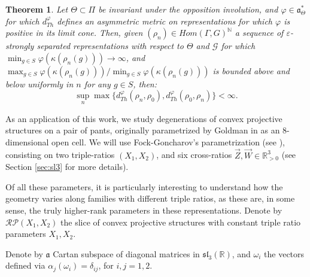 \documentclass{amsart}
\newtheorem{thm}{Theorem}[section]
\theoremstyle{remark}
\theoremstyle{definition}
\begin{document}
\begin{thm}
Let $\Theta \subset \Pi$ be invariant under the opposition involution, and $\varphi \in \mathfrak{a}_\Theta^*$ for which $d^{\varphi}_{Th}$ defines an asymmetric metric on representations for which $\varphi$ is positive in its limit cone. 
Then, given $(\rho_n) \in Hom (\Gamma,G)^\mathbb{N}$ a sequence of $\varepsilon$-strongly separated representations with respect to $\Theta$ and $\mathcal{G}$ for which $\min_{g \in S} \varphi (\kappa (\rho_n (g)))\to \infty$, and $\max_{g \in S} \varphi (\kappa (\rho_n (g)))/\min_{g \in S} \varphi (\kappa (\rho_n (g)))$ is bounded above and below uniformly in $n$ for any $g \in S$, then:
$$\sup_n \max\{ d_{Th}^\varphi (\rho_n, \rho_0), d_{Th}^\varphi (\rho_0,\rho_n)\} <\infty.$$
\end{thm}

As an application of this work, we study degenerations of convex projective structures on a pair of pants, originally parametrized by Goldman in \cite{goldman1990convex} as an $8$-dimensional open cell.
We will use Fock-Goncharov's parametrization (see \cite{fock2007moduli}), consisting on two triple-ratios $(X_1, X_2)$, and six cross-ratios $\vec{Z},\vec{W} \in \mathbb{R}^3_{>0}$ (see Section \ref{sec:sl3} for more details).

Of all these parameters, it is particularly interesting to understand how the geometry varies along families with different triple ratios, as these are, in some sense, the truly higher-rank parameters in these representations.
Denote by $\mathcal{RP} (X_1, X_2)$ the slice of convex projective structures with constant triple ratio parameters $X_1, X_2$.

Denote by $\mathfrak{a}$ Cartan subspace of diagonal matrices in $\mathfrak{sl}_3 (\mathbb{R})$, and $\omega_i$ the vectors defined via $\alpha_j (\omega_i) = \delta_{ij}$, for $i,j =1,2$.
\end{document}
